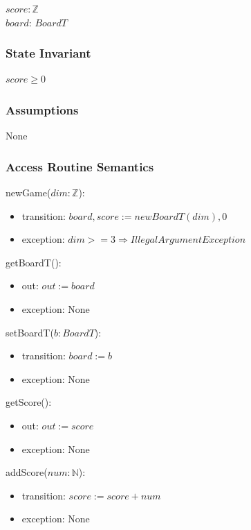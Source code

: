 \documentclass[12pt]{article}
\begin{document}
$\mathit{score}: \mathbb{Z}$\\
$\mathit{board}$: $BoardT$

\subsubsection* {State Invariant}

$score \ge 0$

\subsubsection* {Assumptions}

None

\subsubsection* {Access Routine Semantics}

\noindent newGame($dim: \mathbb{Z}$):
\begin{itemize}
  \item transition: $board, score := new BoardT(dim), 0$
  \item exception: $dim >= 3 \Rightarrow IllegalArgumentException$
\end{itemize}

\noindent getBoardT():
\begin{itemize}
  \item out: $out := board$
  \item exception: None
\end{itemize}

\noindent setBoardT($b: BoardT$):
\begin{itemize}
  \item transition: $board := b$
  \item exception: None
\end{itemize}

\noindent getScore():
\begin{itemize}
  \item out: $out := score$
  \item exception: None
\end{itemize}

\noindent addScore($num: \mathbb{N}$):
\begin{itemize}
  \item transition: $score := score + num$
  \item exception: None
\end{itemize}
\end{document}
